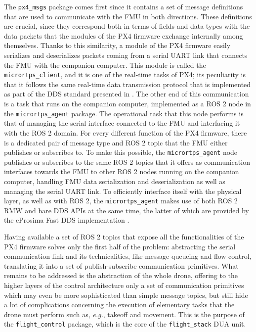 The \texttt{px4\_msgs} package comes first since it contains a set of message definitions that are used to communicate with the FMU in both directions. These definitions are crucial, since they correspond both in terms of fields and data types with the data packets that the modules of the PX4 firmware exchange internally among themselves. Thanks to this similarity, a module of the PX4 firmware easily serializes and deserializes packets coming from a serial UART link that connects the FMU with the companion computer. This module is called the \texttt{micrortps\_client}, and it is one of the real-time tasks of PX4; its peculiarity is that it follows the same real-time data transmission protocol that is implemented as part of the DDS standard presented in . The other end of this communication is a task that runs on the companion computer, implemented as a ROS 2 node in the \texttt{micrortps\_agent} package. The operational task that this node performs is that of managing the serial interface connected to the FMU and interfacing it with the ROS 2 domain. For every different function of the PX4 firmware, there is a dedicated pair of message type and ROS 2 topic that the FMU either publishes or subscribes to. To make this possible, the \texttt{micrortps\_agent} node publishes or subscribes to the same ROS 2 topics that it offers as communication interfaces towards the FMU to other ROS 2 nodes running on the companion computer, handling FMU data serialization and deserialization as well as managing the serial UART link. To efficiently interface itself with the physical layer, as well as with ROS 2, the \texttt{micrortps\_agent} makes use of both ROS 2 RMW and bare DDS APIs at the same time, the latter of which are provided by the eProsima Fast DDS implementation \cite{eprosima_fast_nodate}.

Having available a set of ROS 2 topics that expose all the functionalities of the PX4 firmware solves only the first half of the problem: abstracting the serial communication link and its technicalities, like message queueing and flow control, translating it into a set of publish-subscribe communication primitives. What remains to be addressed is the abstraction of the whole drone, offering to the higher layers of the control architecture only a set of communication primitives which may even be more sophisticated than simple message topics, but still hide a lot of complications concerning the execution of elementary tasks that the drone must perform such as, \emph{e.g.}, takeoff and movement. This is the purpose of the \texttt{flight\_control} package, which is the core of the \texttt{flight\_stack} DUA unit.

